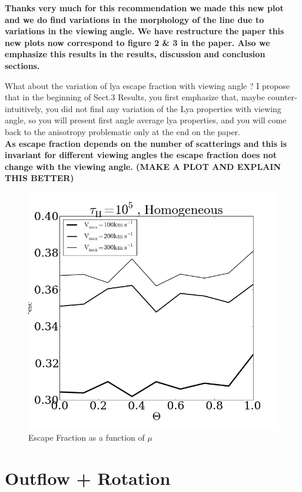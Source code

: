 \documentclass[12pt]{article}
\begin{document}
\textbf{Thanks very much for this recommendation we made this new plot and we do find variations in the morphology of the line due to variations in the viewing angle. We have restructure the paper this new plots now correspond to figure 2 \& 3 in the paper.  Also we emphasize this results in the results, discussion and conclusion sections.\\}

What about the variation of lya escape fraction with viewing angle ? I propose that in the beginning of Sect.3 Results, you first emphasize that, maybe counter-intuitively, you did not find any variation of the Lya properties with viewing angle, so you will present first angle average lya properties, and you will come back to the anisotropy problematic only at the end on the paper.\\

\textbf{As escape fraction depends on the number of scatterings and this is invariant for different viewing angles the escape fraction does not change with the viewing angle. (MAKE A PLOT AND EXPLAIN THIS BETTER)
}

\begin{figure}
\includegraphics[scale=0.5]{escapefractionvstheta.png}
\caption{Escape Fraction as a function of $\mu$}
\end{figure}


\section*{Outflow + Rotation}
\end{document}
